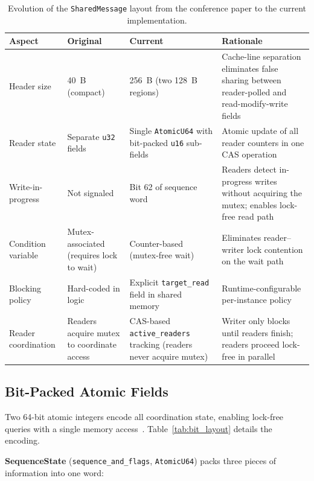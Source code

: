 \begin{table}[!ht]
    \centering
    \caption{Evolution of the \texttt{SharedMessage} layout from the conference paper to the current implementation.}
    \label{tab:paper_vs_current}
    \footnotesize
    \begin{tabular}{>{\raggedright}p{2.5cm}>{\raggedright}p{3.2cm}>{\raggedright}p{3.2cm}>{\raggedright\arraybackslash}p{4.5cm}}
        \toprule
        \textbf{Aspect} & \textbf{Original} & \textbf{Current} & \textbf{Rationale} \\
        \midrule
        Header size & 40~B (compact) & 256~B (two 128~B regions) & Cache-line separation eliminates false sharing between reader-polled and read-modify-write fields \\
        Reader state & Separate \texttt{u32} fields & Single \texttt{AtomicU64} with bit-packed \texttt{u16} sub-fields & Atomic update of all reader counters in one CAS operation \\
        Write-in-progress & Not signaled & Bit 62 of sequence word & Readers detect in-progress writes without acquiring the mutex; enables lock-free read path \\
        Condition variable & Mutex-associated (requires lock to wait) & Counter-based (mutex-free wait) & Eliminates reader--writer lock contention on the wait path \\
        Blocking policy & Hard-coded in logic & Explicit \texttt{target\_read} field in shared memory & Runtime-configurable per-instance policy \\
        Reader coordination & Readers acquire mutex to coordinate access & CAS-based \texttt{active\_readers} tracking (readers never acquire mutex) & Writer only blocks until readers finish; readers proceed lock-free in parallel \\
        \bottomrule
    \end{tabular}
\end{table}

\newpage
\subsection{Bit-Packed Atomic Fields}
\label{subsec:packed_fields}

Two 64-bit atomic integers encode all coordination state, enabling lock-free queries with a single memory access~\cite{boehm2008}. Table~\ref{tab:bit_layout} details the encoding.

\textbf{SequenceState} (\texttt{sequence\_and\_flags}, \texttt{AtomicU64}) packs three pieces of information into one word:

